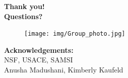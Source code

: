 \documentclass[7pt]{beamer}
\begin{document}
\begin{frame}
	\frametitle{}
		\hspace{1.75cm}
		\begin{minipage}{70mm}   
                 	\begin{alertblock}{}    
                        		 \begin{center}
                  			\textbf{Thank you! \\Questions?}\\
		\begin{figure}[H]
			\texttt{[image: img/Group\_photo.jpg]}
	 	\end{figure}
				\textbf{Acknowledgements:}\\
					NSF, USACE, SAMSI\\
					Anusha Madushani, Kimberly Kaufeld
				\end{center}
      			\end{alertblock}
		\end{minipage}
\end{frame}

\end{document}
